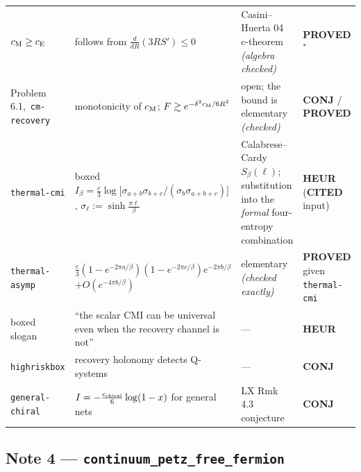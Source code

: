 \documentclass[11pt]{article}
\newcommand{\stPR}{{\color{okgreen}\textsf{\scriptsize\bfseries PROVED}}}
\newcommand{\stPMC}{{\color{teal}\textsf{\scriptsize\bfseries PROVED$^\ast$}}}
\newcommand{\stCIT}{{\color{navy}\textsf{\scriptsize\bfseries CITED}}}
\newcommand{\stHEU}{{\color{warn}\textsf{\scriptsize\bfseries HEUR}}}
\newcommand{\stCON}{{\color{warn}\textsf{\scriptsize\bfseries CONJ}}}
\newcommand{\CMI}{I}
\begin{document}
{\begin{tabularx}{\textwidth}{L{0.150\textwidth} X L{0.215\textwidth} L{0.098\textwidth}}
$c_{\rm M}\ge c_{\rm E}$ & follows from $\frac{d}{dR}(3RS')\le0$ & Casini--Huerta 04 c-theorem \emph{(algebra checked)} & \stPMC \\
Problem 6.1,\ \texttt{cm-recovery} & monotonicity of $c_{\rm M}$; $F\gtrsim e^{-\delta^2c_{\rm M}/6R^2}$ & open; the bound is elementary \emph{(checked)} & \stCON{} / \stPR \\
\texttt{thermal-cmi} & boxed $\CMI_\beta=\frac c3\log\bigl[\sigma_{a+b}\sigma_{b+c}/(\sigma_b\sigma_{a+b+c})\bigr]$, $\sigma_\ell:=\sinh\frac{\pi\ell}\beta$ & Calabrese--Cardy $S_\beta(\ell)$; substitution into the \emph{formal} four-entropy combination & \stHEU{} (\stCIT{} input) \\
\texttt{thermal-asymp} & $\frac c3(1{-}e^{-2\pi a/\beta})(1{-}e^{-2\pi c/\beta})e^{-2\pi b/\beta}$ $+O(e^{-4\pi b/\beta})$ & elementary \emph{(checked exactly)} & \stPR{} given \texttt{thermal-cmi} \\
boxed slogan & ``the scalar CMI can be universal even when the recovery channel is not'' & --- & \stHEU \\
\texttt{highriskbox} & recovery holonomy detects Q-systems & --- & \stCON \\
\texttt{general-\allowbreak chiral} & $\CMI=-\frac{c_{\rm chiral}}6\log(1-x)$ for general nets & LX Rmk 4.3 conjecture & \stCON \\
\bottomrule
\end{tabularx}}

\subsection{Note 4 --- \texttt{continuum\_petz\_free\_fermion}}
\end{document}
